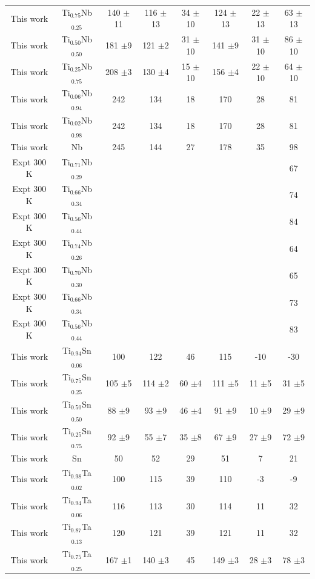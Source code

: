 \begin{longtable}[H]{ c c c c c c c c}
	This work & Ti$_{0.75}$Nb$_{0.25}$ & 140 $\pm$11 & 116 $\pm$13 & 34 $\pm$10 & 124 $\pm$13 & 22 $\pm$13 & 63 $\pm$13\\
	This work & Ti$_{0.50}$Nb$_{0.50}$ & 181 $\pm$9 & 121 $\pm$2 & 31 $\pm$10 & 141 $\pm$9 & 31 $\pm$10 & 86 $\pm$10\\
	This work & Ti$_{0.25}$Nb$_{0.75}$ & 208 $\pm$3 & 130 $\pm$4 & 15 $\pm$10 & 156 $\pm$4 & 22 $\pm$10 & 64 $\pm$10\\
	This work & Ti$_{0.06}$Nb$_{0.94}$ & 242 & 134 & 18 & 170 & 28 & 81\\
	This work & Ti$_{0.02}$Nb$_{0.98}$ & 242 & 134 & 18 & 170 & 28 & 81\\
	This work & Nb & 245 & 144 & 27 & 178 & 35 & 98\\
	Expt 300 K \cite{Ozaki2004} & Ti$_{0.71}$Nb$_{0.29}$ & & & & & & 67\\
	Expt 300 K \cite{Ozaki2004} & Ti$_{0.66}$Nb$_{0.34}$ & & & & & & 74\\
	Expt 300 K \cite{Ozaki2004} & Ti$_{0.56}$Nb$_{0.44}$ & & & & & & 84\\
	Expt 300 K \cite{Boyer1994} & Ti$_{0.74}$Nb$_{0.26}$ & & & & & & 64\\
	Expt 300 K \cite{Boyer1994} & Ti$_{0.70}$Nb$_{0.30}$ & & & & & & 65\\
	Expt 300 K \cite{Boyer1994} & Ti$_{0.66}$Nb$_{0.34}$ & & & & & & 73\\
	Expt 300 K \cite{Boyer1994} & Ti$_{0.56}$Nb$_{0.44}$ & & & & & & 83\\
	This work & Ti$_{0.94}$Sn$_{0.06}$ & 100 & 122 & 46 & 115 & -10 & -30\\
	This work & Ti$_{0.75}$Sn$_{0.25}$ & 105 $\pm$5 & 114 $\pm$2 & 60 $\pm$4 & 111 $\pm$5 & 11 $\pm$5 & 31 $\pm$5\\
	This work & Ti$_{0.50}$Sn$_{0.50}$ & 88 $\pm$9 & 93 $\pm$9 & 46 $\pm$4 & 91 $\pm$9 & 10 $\pm$9 & 29 $\pm$9\\
	This work & Ti$_{0.25}$Sn$_{0.75}$ & 92 $\pm$9 & 55 $\pm$7 & 35 $\pm$8 & 67 $\pm$9 & 27 $\pm$9 & 72 $\pm$9\\
	This work & Sn & 50 & 52 & 29 & 51 & 7 & 21\\
	This work & Ti$_{0.98}$Ta$_{0.02}$ & 100 & 115 & 39 & 110 & -3 & -9\\
	This work & Ti$_{0.94}$Ta$_{0.06}$ & 116 & 113 & 30 & 114 & 11 & 32\\
	This work & Ti$_{0.87}$Ta$_{0.13}$ & 120 & 121 & 39 & 121 & 11 & 32\\
	This work & Ti$_{0.75}$Ta$_{0.25}$ & 167 $\pm$1 & 140 $\pm$3 & 45 & 149 $\pm$3 & 28 $\pm$3 & 78 $\pm$3\\

\end{longtable}
